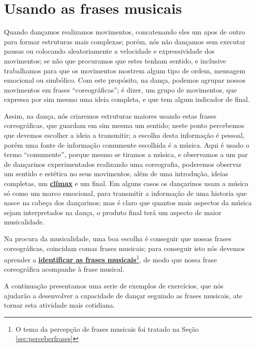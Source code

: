 
\section{Usando as frases musicais}
Quando dançamos realizamos movimentos, 
concatenando eles um apos de outro para formar estruturas mais complexas;
porém, nós não dançamos sem executar pausas ou colocando aleatoriamente a velocidade 
e expressividade dos movimentos; 
se não que procuramos que estes tenham sentido, 
e inclusive trabalhamos para que os movimentos mostrem algum tipo de ordem, mensagem emocional ou simbólico.
Com este propósito, na dança, podemos agrupar nossos movimentos em frases ``coreográficas'';
é dizer, um grupo de movimentos, que expressa por sim mesmo uma ideia completa, 
e que tem algum indicador de final. 

Assim, na dança, 
nós criaremos estruturas maiores usando estas frases coreográficas, 
que guardam em sim mesma um sentido; 
neste ponto percebemos que devemos escolher a ideia a transmitir;
a escolha desta informação é pessoal, porém uma fonte de informação comumente escolhida é a música.
Aqui é usado o termo ``comumente'', porque mesmo se tiramos a música, 
e observamos a um par de dançarinos experimentados realizando uma coreografia, 
poderemos observar um sentido e estética no seus movimentos,
além de uma introdução, ideias completas, um \hyperref[ref:climax]{\textbf{clímax}}  e um final.
Em alguns casos os dançarinos usam a música só como um marco emocional,
para transmitir a informação de uma historia que nasce na cabeça dos dançarinos;
mas é claro que quantos mais aspectos da música sejam interpretados na dança,
o produto final terá um aspecto de maior musicalidade.

Na procura da musicalidade, uma boa escolha é conseguir que nossas frases coreográficas,
coincidam comas frases musicais;
para conseguir isto nós devemos aprender a 
\hyperref[sec:perceberfrases]{\textbf{identificar as frases musicais}}\footnote{O 
tema da percepção de frases musicais foi tratado na Seção \ref{sec:perceberfrases}},
de modo que  nossa frase coreográfica acompanhe à frase musical.

A continuação presentamos uma serie de exemplos de exercícios, 
que nós ajudarão a desenvolver a capacidade de dançar seguindo as frases musicais,
ate tornar esta atividade mais cotidiana.

